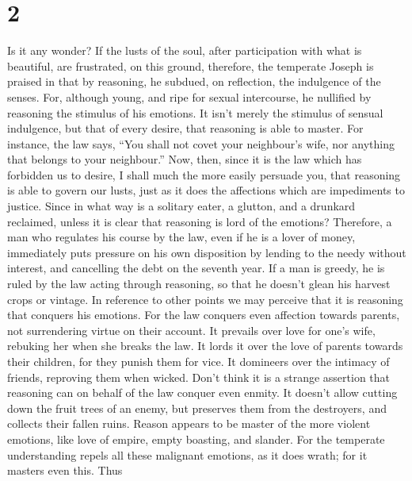 \hypertarget{section-1}{%
\section{2}\label{section-1}}

 Is it any wonder? If the lusts of the soul, after
participation with what is beautiful, are frustrated,  on
this ground, therefore, the temperate Joseph is praised in that by
reasoning, he subdued, on reflection, the indulgence of the senses.
 For, although young, and ripe for sexual intercourse, he
nullified by reasoning the stimulus of his emotions.  It
isn't merely the stimulus of sensual indulgence, but that of every
desire, that reasoning is able to master.  For instance, the
law says, ``You shall not covet your neighbour's wife, nor anything that
belongs to your neighbour.''  Now, then, since it is the law
which has forbidden us to desire, I shall much the more easily persuade
you, that reasoning is able to govern our lusts, just as it does the
affections which are impediments to justice.  Since in what
way is a solitary eater, a glutton, and a drunkard reclaimed, unless it
is clear that reasoning is lord of the emotions?  Therefore,
a man who regulates his course by the law, even if he is a lover of
money, immediately puts pressure on his own disposition by lending to
the needy without interest, and cancelling the debt on the seventh year.
 If a man is greedy, he is ruled by the law acting through
reasoning, so that he doesn't glean his harvest crops or vintage. In
reference to other points we may perceive that it is reasoning that
conquers his emotions.  For the law conquers even affection
towards parents, not surrendering virtue on their account. 
It prevails over love for one's wife, rebuking her when she breaks the
law.  It lords it over the love of parents towards their
children, for they punish them for vice. It domineers over the intimacy
of friends, reproving them when wicked.  Don't think it is
a strange assertion that reasoning can on behalf of the law conquer even
enmity.  It doesn't allow cutting down the fruit trees of
an enemy, but preserves them from the destroyers, and collects their
fallen ruins.  Reason appears to be master of the more
violent emotions, like love of empire, empty boasting, and slander.
 For the temperate understanding repels all these malignant
emotions, as it does wrath; for it masters even this.  Thus
